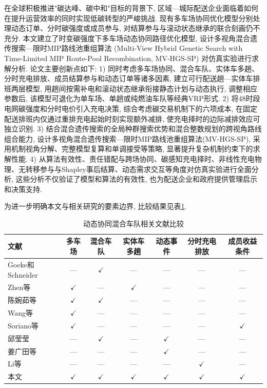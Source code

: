 \documentclass{setp-new}
\newcommand{\setptabsetup}{\fontsize{9pt}{10.5pt}\selectfont\renewcommand{\arraystretch}{0.95}\setlength{\tabcolsep}{2.2pt}\setlength{\aboverulesep}{0.4pt}\setlength{\belowrulesep}{0.4pt}\hbadness=10000}
\begin{document}
在全球积极推进"碳达峰、碳中和"目标的背景下,
区域—城际配送企业面临着如何在提升运营效率的同时实现低碳转型的严峻挑战.
现有多车场协同优化模型分别处理动态订单、分时碳强度或成员参与,
对结算参与与滚动状态继承的联合刻画仍不充分.
本文建立了时变碳强度下多车场动态协同路径优化模型,
设计多视角混合遗传搜索—限时MIP路线池重组算法
(Multi-View Hybrid Genetic Search with Time-Limited MIP Route-Pool Recombination, MV-HGS-SP)
对仿真实验进行求解分析.
论文主要创新点如下:
1) 同时考虑多车场协同、混合车队、实体车多趟、分时充电排放、成员结算参与和动态订单等诸多因素,
建立可行配送趟—实体车排班两层模型,
用趟间按需补电和滚动状态继承衔接静态计划与动态执行,
调整相应参数后, 该模型可退化为单车场、单趟或纯燃油车队等经典VRP形式.
2) 将48时段电网碳强度和分时电价引入充电决策, 综合考虑碳交易机制下的六项成本,
在固定配送排班内仅通过重排充电起始时刻实现额外减排,
使充电择时的边际减排效应可独立识别.
3) 结合混合遗传搜索的全局种群搜索优势和混合整数规划的跨视角路线组合能力,
设计多视角混合遗传搜索—限时MIP路线池重组算法(MV-HGS-SP),
采用机制视角分解、完整模型复算和单调接受等策略, 显著提升复杂机制约束下的求解性能.
4) 从算法有效性、责任错配与跨场协同、碳感知充电择时、非线性充电物理、无转移参与与Shapley事后结算、动态需求交互等角度对仿真实验进行全面分析,
这些分析不仅验证了模型和算法的有效性,
也为配送企业和政府提供管理启示和决策支持.

为进一步明确本文与相关研究的要素边界, 比较结果见表\ref{tab:literature-comparison}.

\begin{table}[H]
\centering
\caption{动态协同混合车队相关文献比较}
\label{tab:literature-comparison}
\setptabsetup
\begin{tabular*}{\linewidth}{@{\extracolsep{\fill}}lcccccc@{}}
\toprule
文献 & 多车场 & 混合车队 & 实体车多趟 & 动态事件 & 分时充电排放 & 成员收益条件\\
\midrule
Goeke和Schneider\cite{ref:27} & --- & $\checkmark$ & --- & --- & --- & ---\\
Zhen等\cite{ref:44} & $\checkmark$ & --- & $\checkmark$ & --- & --- & ---\\
陈婉茹等\cite{ref:23} & $\checkmark$ & $\checkmark$ & --- & --- & --- & ---\\
Wang等\cite{ref:7} & $\checkmark$ & --- & --- & --- & --- & ---\\
Soriano等\cite{ref:8} & $\checkmark$ & --- & --- & --- & --- & $\checkmark$\\
邱莹莹\cite{ref:71} & --- & $\checkmark$ & --- & $\checkmark$ & --- & ---\\
姜广田等\cite{ref:51} & --- & --- & --- & $\checkmark$ & --- & ---\\
Li等\cite{ref:52} & --- & --- & --- & --- & $\checkmark$ & ---\\
本文 & $\checkmark$ & $\checkmark$ & $\checkmark$ & $\checkmark$ & $\checkmark$ & $\checkmark$\\
\bottomrule
\end{tabular*}
\end{table}
\end{document}
